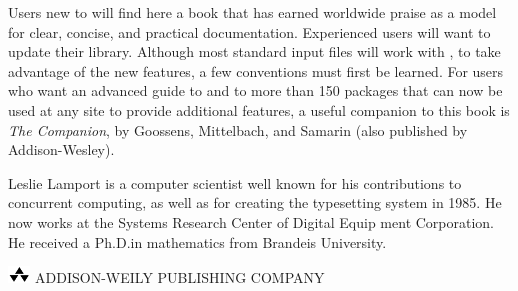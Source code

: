 \begin{titlepage}
Users new to \ltx{} will find here a book that has earned worldwide praise as a model for clear,
concise, and practical documentation. Experienced users will want to update their \ltx{} library. 
Although most standard \ltx{} input files will work with \ltxee{}, to take advantage of
the new features, a few \ltxee{} conventions must first be learned. For users who 
want an advanced guide to \ltxee{} and to more than 150 packages that can now be used 
at any site to provide additional features, a useful companion to this book is \textit{The \ltx{} Companion}, 
by Goossens, Mittelbach, and Samarin (also published by Addison-Wesley).

\medskip
\noindent\parbox{.6\linewidth}{
\qquad Leslie Lamport is a computer scientist well known for
his contributions to concurrent computing, as well as for
creating the \ltx{} typesetting system in 1985. He now
works at the Systems Research Center of Digital Equip
ment Corporation. He received a Ph.D.in mathematics
from Brandeis University.

\bigskip
\includegraphics[width=1.6em]{./figure/addison-wesley-logo.png} %
ADDISON-WEILY PUBLISHING COMPANY
}\parbox{.4\linewidth}{\hfill{}}
\end{titlepage}
\restoregeometry